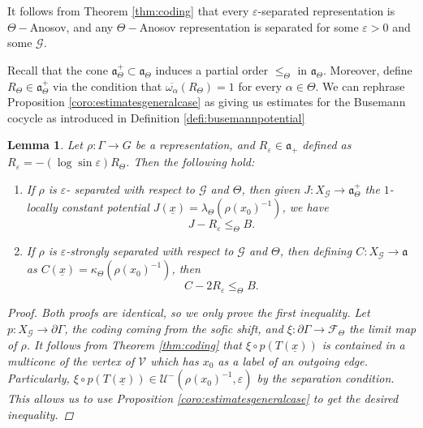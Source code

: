 \documentclass{amsart}
\newtheorem{lemma}[thm]{Lemma}
\theoremstyle{remark}
\theoremstyle{definition}
\begin{document}
It follows from Theorem \ref{thm:coding} that every $\varepsilon$-separated representation is $\Theta-$Anosov, and any $\Theta-$Anosov representation is separated for some $\varepsilon >0$ and some $\mathcal{G}$.

Recall that the cone $\mathfrak{a}_\Theta^+ \subset \mathfrak{a}_\Theta$ induces a partial order $\leq_\Theta$ in $\mathfrak{a}_\Theta$.
Moreover, define $R_\Theta \in \mathfrak{a}^+_\Theta$ via the condition that $\overline{\omega_\alpha} (R_\Theta) = 1$ for every $\alpha \in \Theta$.
We can rephrase Proposition \ref{coro:estimatesgeneralcase} as giving us estimates for the Busemann cocycle as introduced in Definition \ref{defi:busemannpotential}


\begin{lemma}
\label{lemma:key}
 Let $\rho: \Gamma \rightarrow G$ be a representation, and $R_\varepsilon \in \mathfrak{a}_+$ defined as $R_\varepsilon = - (\log \sin \varepsilon) R_\Theta$.  
 Then the following hold:
    \begin{enumerate}
        \item If $\rho$ is $\varepsilon$- separated with respect to $\mathcal{G}$ and $\Theta$, then given $J : X_\mathcal{G} \rightarrow \mathfrak{a}^+_\Theta$ the $1$-locally constant potential $J (\underline{x}) = \lambda_\Theta (\rho (x_0)^{-1})$, we have $$J - R_\varepsilon \leq_\Theta B.$$
        \item If $\rho$ is $\varepsilon$-strongly separated with respect to $\mathcal{G}$ and $\Theta$, then defining $C : X_\mathcal{G} \rightarrow \mathfrak{a}$ as $C (\underline{x}) =  \kappa_\Theta (\rho (x_0)^{-1})$, then $$C -  2R_\varepsilon \leq_\Theta B.$$
    \end{enumerate}
    \begin{proof}
 Both proofs are identical, so we only prove the first inequality.
 Let $p : X_\mathcal{G} \rightarrow \partial \Gamma$, the coding coming from the sofic shift, and $\xi : \partial \Gamma \rightarrow \mathcal{F}_\Theta$ the limit map of $\rho$.
 It follows from Theorem \ref{thm:coding} that $\xi \circ p (T (\underline{x}))$ is contained in a multicone of the vertex of $\mathcal{V}$ which has $x_0$ as a label of an outgoing edge.
 Particularly, $\xi \circ p (T (\underline{x})) \in \mathcal{U}^- (\rho (x_0)^{-1},\varepsilon)$ by the separation condition.
 This allows us to use Proposition \ref{coro:estimatesgeneralcase} to get the desired inequality.
\end{proof}
\end{lemma}
\end{document}
